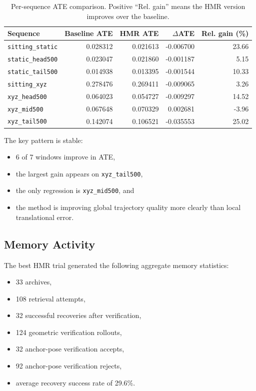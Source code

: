 \documentclass[11pt]{article}
\begin{document}
\begin{table}[p]
\centering
\caption{Per-sequence ATE comparison. Positive ``Rel. gain'' means the HMR
version improves over the baseline.}
\label{tab:perseq}
\begin{tabular}{lrrrr}
\toprule
Sequence & Baseline ATE & HMR ATE & $\Delta$ATE & Rel. gain (\%) \\
\midrule
\texttt{sitting\_static} & 0.028312 & 0.021613 & -0.006700 & 23.66 \\
\texttt{static\_head500} & 0.023047 & 0.021860 & -0.001187 & 5.15 \\
\texttt{static\_tail500} & 0.014938 & 0.013395 & -0.001544 & 10.33 \\
\texttt{sitting\_xyz} & 0.278476 & 0.269411 & -0.009065 & 3.26 \\
\texttt{xyz\_head500} & 0.064023 & 0.054727 & -0.009297 & 14.52 \\
\texttt{xyz\_mid500} & 0.067648 & 0.070329 & 0.002681 & -3.96 \\
\texttt{xyz\_tail500} & 0.142074 & 0.106521 & -0.035553 & 25.02 \\
\bottomrule
\end{tabular}
\end{table}

The key pattern is stable:
\begin{itemize}
\item 6 of 7 windows improve in ATE,
\item the largest gain appears on \texttt{xyz\_tail500},
\item the only regression is \texttt{xyz\_mid500}, and
\item the method is improving global trajectory quality more clearly than local
translational error.
\end{itemize}

\subsection{Memory Activity}
The best HMR trial generated the following aggregate memory statistics:
\begin{itemize}
\item 33 archives,
\item 108 retrieval attempts,
\item 32 successful recoveries after verification,
\item 124 geometric verification rollouts,
\item 32 anchor-pose verification accepts,
\item 92 anchor-pose verification rejects,
\item average recovery success rate of 29.6\%.
\end{itemize}
\end{document}
